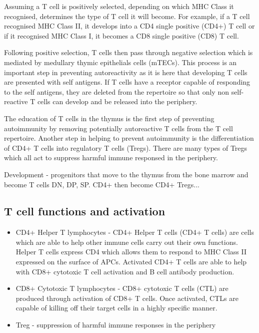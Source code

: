 Assuming a T cell is positively selected, depending on which MHC Class it recognised, determines the type of T cell it will become.
For example, if a T cell recognised MHC Class II, it develops into a CD4 single positive (CD4+) T cell or if it recognised MHC Class I, it becomes a CD8 single positive (CD8) T cell.

Following positive selection, T cells then pass through negative selection which is mediated by medullary thymic epithelials cells (mTECs).
This process is an important step in preventing autoreactivity as it is here that developing T cells are presented with self antigens.
If T cells have a receptor capable of responding to the self antigens, they are deleted from the repertoire so that only non self-reactive T cells can develop and be released into the periphery.

The education of T cells in the thymus is the first step of preventing autoimmunity by removing potentially autoreactive T cells from the T cell repertoire.
Another step in helping to prevent autoimmunity is the differentiation of CD4+ T cells into regulatory T cells (Tregs).
There are many types of Tregs which all act to suppress harmful immune responsed in the periphery.


Development - progenitors that move to the thymus from the bone marrow and become T cells
DN, DP, SP.
CD4+ then become CD4+ Tregs...
\subsection{T cell functions and activation}

\begin{itemize}
\item CD4+ Helper T lymphocytes - CD4+ Helper T cells (CD4+ T cells) are cells which are able to help other immune cells carry out their own functions. 
Helper T cells express CD4 which allows them to respond to MHC Class II expressed on the surface of APCs. 
Activated CD4+ T cells are able to help with CD8+ cytotoxic T cell activation and B cell antibody production.
\item CD8+ Cytotoxic T lymphocytes - CD8+ cytotoxic T cells (CTL) are produced through activation of CD8+ T cells.
Once activated, CTLs are capable of killing off their target cells in a highly specific manner.
\item Treg - suppression of harmful immune responses in the periphery
\end{itemize}



